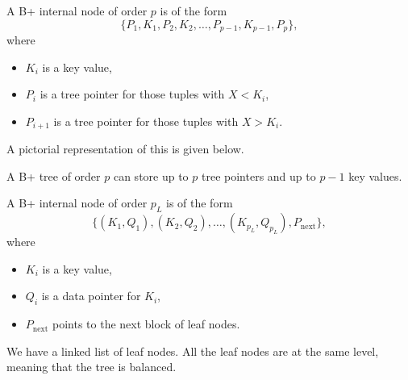 \documentclass[a4paper, openany]{memoir}
\newcommand{\bplusinternalnodesng}[3]{
    \draw (0+#1, 0+#2) -- (5*0.75+#1, 0+#2)
    -- (5*0.75+#1, 0.5+#2) 
    -- (0+#1, 0.5+#2)
    -- cycle;
    \foreach \i in {1, 2, 3, 4} {
        \draw (\i*0.75+#1, 0+#2) -- (\i*0.75+#1, 0.5+#2);
    }
    \foreach \i in {0, 2} {
        \draw[fill=black] (\i*0.75+0.75/2+#1, 0.25+#2) circle (2pt);
    }
    \foreach \x[count=\i] in {#3} {
        \node at (\i*0.75*2-0.75+0.75/2+#1, 0.25+#2) {\texttt{\x}};
    }
}
\newcommand{\bplusinternalnodedbl}[3]{
    \draw (0+#1, 0+#2) -- (5*0.75+#1, 0+#2)
    -- (5*0.75+#1, 0.5+#2) 
    -- (0+#1, 0.5+#2)
    -- cycle;
    \foreach \i in {1, 2, 3, 4} {
        \draw (\i*0.75+#1, 0+#2) -- (\i*0.75+#1, 0.5+#2);
    }
    \foreach \i in {0, 2, 4} {
        \draw[fill=black] (\i*0.75+0.75/2+#1, 0.25+#2) circle (2pt);
    }
    \foreach \x[count=\i] in {#3} {
        \node at (\i*0.75*2-0.75+0.75/2+#1, 0.25+#2) {\texttt{\x}};
    }
}
\newcommand{\bplusleafnodedbl}[3]{
    \draw (0+#1, 0+#2) -- (2+#1, 0+#2)
    -- (2+#1, 0.5+#2)
    -- (0+#1, 0.5+#2)
    -- cycle;

    \draw (1+#1, 0+#2) -- (1+#1, 0.5+#2);

    \foreach \x[count=\i] in {#3} {
        \filldraw[red] (\i-0.25+#1, 0.25+#2) circle (2pt);
        \node at (\i-0.75+#1, 0.25+#2) {\texttt{\x}};
    }
}
\newcommand{\bplusleafnodesng}[3]{
    \draw (0+#1, 0+#2) -- (1+#1, 0+#2)
    -- (1+#1, 0.5+#2)
    -- (0+#1, 0.5+#2)
    -- cycle;

    \filldraw[red] (0.75+#1, 0.25+#2) circle (2pt);
    \node at (0.25+#1, 0.25+#2) {\texttt{#3}};
}
\begin{document}
A B+ internal node of order $p$ is of the form
\[\{P_1, K_1, P_2, K_2, \dots, P_{p-1}, K_{p-1}, P_p\},\]
where
\begin{itemize}
    \item $K_i$ is a key value,
    \item $P_i$ is a tree pointer for those tuples with $X < K_i$,
    \item $P_{i+1}$ is a tree pointer for those tuples with $X > K_i$.
\end{itemize}
A pictorial representation of this is given below.
\begin{figure}[H]
    \centering
\end{figure}
\noindent A B+ tree of order $p$ can store up to $p$ tree pointers and up to $p-1$ key values. 

A B+ internal node of order $p_L$ is of the form
\[\{(K_1, Q_1), (K_2, Q_2), \dots, (K_{p_L}, Q_{p_L}), P_{\text{next}}\},\]
where
\begin{itemize}
    \item $K_i$ is a key value,
    \item $Q_i$ is a data pointer for $K_i$,
    \item $P_{\text{next}}$ points to the next block of leaf nodes.
\end{itemize}
\noindent We have a linked list of leaf nodes. All the leaf nodes are at the same level, meaning that the tree is balanced.
\end{document}
